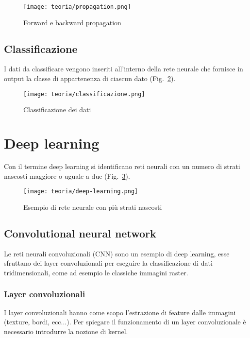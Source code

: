 \begin{figure}[!h] 
    \centering 
    \texttt{[image: teoria/propagation.png]} 
    \caption{Forward e backward propagation}
    \label{fig:propagation}
  \end{figure}

\newpage
\subsection{Classificazione}
I dati da classificare vengono inseriti all'interno della rete neurale che fornisce in output la classe di appartenenza di ciascun dato (Fig.~\ref{fig:classificazione}).

\begin{figure}[!h] 
    \centering 
    \texttt{[image: teoria/classificazione.png]} 
    \caption{Classificazione dei dati}
    \label{fig:classificazione}
  \end{figure}


\section{Deep learning}
Con il termine deep learning si identificano reti neurali con un numero di strati nascosti maggiore o uguale a due (Fig.~\ref{fig:deep-learning}).

\begin{figure}[!h] 
    \centering 
    \texttt{[image: teoria/deep-learning.png]} 
    \caption{Esempio di rete neurale con più strati nascosti}
    \label{fig:deep-learning}
  \end{figure}

\subsection{Convolutional neural network}
Le reti neurali convoluzionali (CNN) sono un esempio di deep learning, esse sfruttano dei layer convoluzionali per eseguire la classificazione di dati tridimensionali, come ad esempio le classiche immagini raster.
\subsubsection{Layer convoluzionali}
I layer convoluzionali hanno come scopo l'estrazione di feature dalle immagini (texture, bordi, ecc...).
Per spiegare il funzionamento di un layer convoluzionale è necessario introdurre la nozione di kernel.

